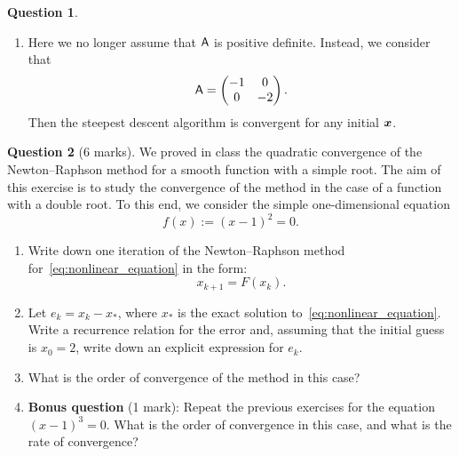\documentclass[11pt]{article}
\theoremstyle{definition}
\newtheorem{question}{Question}
\begin{document}
\begin{question}
\begin{itemize}
\begin{enumerate}
            \item
                Here we no longer assume that $\mathsf A$ is positive definite.
                Instead, we consider that
                \[
                    \mathsf A =
                    \begin{pmatrix}
                        -1 & 0 \\ 0 & -2
                    \end{pmatrix}.
                \]
                Then the steepest descent algorithm is convergent for any initial $\mathbf{\boldsymbol{x}}$.
        \end{enumerate}
    \end{itemize}
\end{question}

\newpage
\begin{question}
    [6 marks]
    We proved in class the quadratic convergence of the Newton--Raphson method for a smooth function with a simple root.
    The aim of this exercise is to study the convergence of the method in the case of a function with a double root.
    To this end, we consider the simple one-dimensional equation
    \begin{equation}
        \label{eq:nonlinear_equation}
        f(x) := (x-1)^2 = 0.
    \end{equation}
    \begin{enumerate}
        \item
            Write down one iteration of the Newton--Raphson method for~\eqref{eq:nonlinear_equation} in the form:
            \[
                x_{k+1} = F(x_k).
            \]

        \item
            Let $e_k = x_k - x_*$, where $x_*$ is the exact solution to~\eqref{eq:nonlinear_equation}.
            Write a recurrence relation for the error and,
            assuming that the initial guess is $x_0 = 2$,
            write down an explicit expression for $e_k$.

        \item
            What is the order of convergence of the method in this case?

        \item
            \textbf{Bonus question} (1 mark):
            Repeat the previous exercises for the equation $(x-1)^3 = 0$.
            What is the order of convergence in this case,
            and what is the rate of convergence?
    \end{enumerate}
\end{question}
\end{document}
